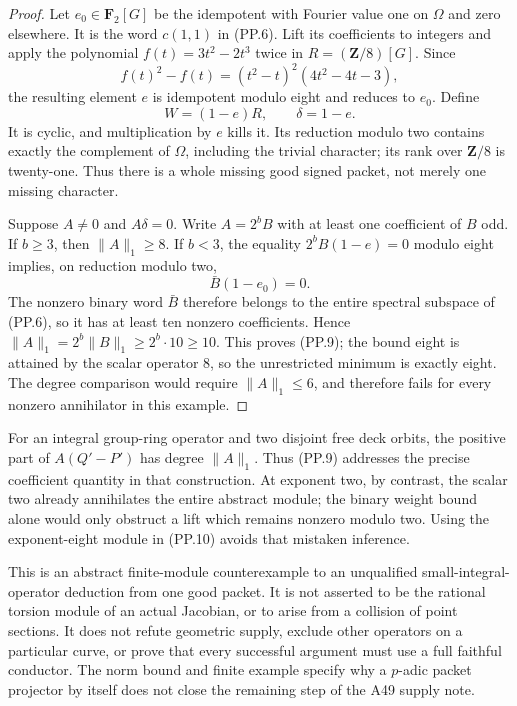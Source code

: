 \documentclass[11pt,a4paper]{article}
\begin{document}
\begin{proof}
Let $e_0\in\mathbf F_2[G]$ be the idempotent with Fourier
value one on $\Omega$ and zero elsewhere. It is the word
$c(1,1)$ in (PP.6). Lift its coefficients to integers and
apply the polynomial $f(t)=3t^2-2t^3$ twice in
$R=(\mathbf Z/8)[G]$. Since
\[
 f(t)^2-f(t)=(t^2-t)^2(4t^2-4t-3),
\]
the resulting element $e$ is idempotent modulo eight and
reduces to $e_0$. Define
\[
                        W=(1-e)R,\qquad\delta=1-e.
 \tag{PP.10}
\]
It is cyclic, and multiplication by $e$ kills it. Its reduction
modulo two contains exactly the complement of $\Omega$,
including the trivial character; its rank over $\mathbf Z/8$
is twenty-one. Thus there is a whole missing good signed
packet, not merely one missing character.

Suppose $A\ne0$ and $A\delta=0$.
Write $A=2^bB$ with at least one coefficient of $B$ odd.
If $b\ge3$, then $\|A\|_1\ge8$.
If $b<3$, the equality
$2^bB(1-e)=0$ modulo eight implies, on reduction modulo two,
\[
                         \bar B(1-e_0)=0.
\]
The nonzero binary word $\bar B$ therefore belongs to the
entire spectral subspace of (PP.6), so it has at least ten
nonzero coefficients. Hence
$\|A\|_1=2^b\|B\|_1\ge2^b\cdot10\ge10$.
This proves (PP.9); the bound eight is attained by the scalar
operator $8$, so the unrestricted minimum is exactly eight.
The degree comparison would require $\|A\|_1\le6$, and
therefore fails for every nonzero annihilator in this example.
\end{proof}

For an integral group-ring operator and two disjoint free
deck orbits, the positive part of $A(Q'-P')$ has degree
$\|A\|_1$. Thus (PP.9) addresses the precise coefficient
quantity in that construction. At exponent two, by contrast,
the scalar two already annihilates the entire abstract module;
the binary weight bound alone would only obstruct a lift
which remains nonzero modulo two. Using the exponent-eight
module in (PP.10) avoids that mistaken inference.

This is an abstract finite-module counterexample to an
unqualified small-integral-operator deduction from one good
packet. It is not asserted to be the rational torsion module
of an actual Jacobian, or to arise from a collision of point
sections. It does not refute geometric supply, exclude other
operators on a particular curve, or prove that every successful
argument must use a full faithful conductor. The norm bound
and finite example specify why a $p$-adic packet projector by
itself does not close the remaining step of the A49 supply note.
\end{document}
